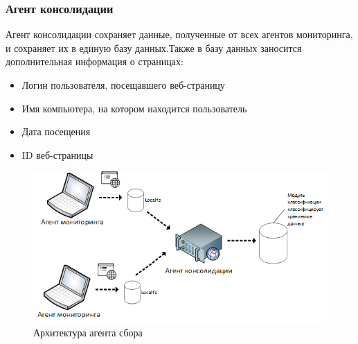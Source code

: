 \documentclass[russian, utf8, emptystyle]{eskdtext}
\begin{document}
\subsubsection {Агент консолидации}
Агент консолидации сохраняет данные, полученные от всех агентов мониторинга, и сохраняет их в единую базу данных.Также в базу данных заносится дополнительная информация о страницах:
\begin{itemize}
	\item Логин пользователя, посещавшего веб-страницу
	\item Имя компьютера, на котором находится пользователь
	\item Дата посещения
	\item ID веб-страницы
\end{itemize}
\begin{figure}[h]
	\begin{center}
		\includegraphics[width=14cm]{pic/agent2.png}
		\caption{Архитектура агента сбора}
		\label{fig:low_sigma}
	\end{center}
\end{figure}
\end{document}
